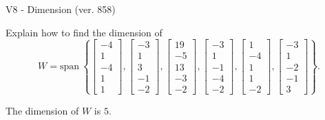 \begin{exercise}
  \begin{exerciseTitle}V8 - Dimension (ver. 858)\end{exerciseTitle}
  \begin{exerciseStatement}
    Explain how to find the dimension of 
\[W=\mathrm{span}\ \left\{\left[\begin{array}{r}
-4 \\
1 \\
-4 \\
1 \\
1
\end{array}\right] , \left[\begin{array}{r}
-3 \\
1 \\
3 \\
-1 \\
-2
\end{array}\right] , \left[\begin{array}{r}
19 \\
-5 \\
13 \\
-3 \\
-2
\end{array}\right] , \left[\begin{array}{r}
-3 \\
1 \\
-1 \\
-4 \\
-2
\end{array}\right] , \left[\begin{array}{r}
1 \\
-4 \\
1 \\
1 \\
-2
\end{array}\right] , \left[\begin{array}{r}
-3 \\
1 \\
-2 \\
-1 \\
3
\end{array}\right]\right\}.\]



  \end{exerciseStatement}
  \begin{exerciseAnswer}
   The dimension of \(W\) is  \(5\).
  


  \end{exerciseAnswer}
\end{exercise}